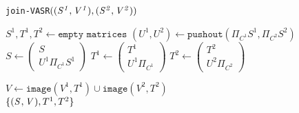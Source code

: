 
	\begin{algorithm}
		\caption{\texttt{join-VASR$(\mathit{(S^{1}, V^{1})}, \mathit{(S^{2}, V^{2})})$}}\label{euclid}
		\begin{algorithmic}[1]
			\State $\mathit{S^1, T^1, T^2} \gets \texttt{empty matrices}$
					\State $(U^1, U^2) \gets \texttt{pushout}(\mathit{\Pi_{C^1}S^1, \Pi_{C^2}S^2})$
					\medskip
					\State $S \gets
					 \begin{pmatrix}
						S \\
						\mathit{U^1\Pi_{C^1}S^1}
					\end{pmatrix}$
					\medskip
					\State $T^1 \gets
					\begin{pmatrix}
						T^1 \\
						\mathit{U^1\Pi_{C^1}}
					\end{pmatrix}$
					\medskip
					\State $T^2 \gets
					\begin{pmatrix}
						T^2 \\
						\mathit{U^2\Pi_{C^2}}
					\end{pmatrix}$									
				\EndFor
			\EndFor
			
			\State $\mathit{V} \gets \texttt{image}(\mathit{V^1, T^1}) \cup \texttt{image}(\mathit{V^2, T^2})$ \\
			\Return $\{ \mathit{(S^{}, V^{})}, T^1, T^2 \}$
		\end{algorithmic}
	\end{algorithm}